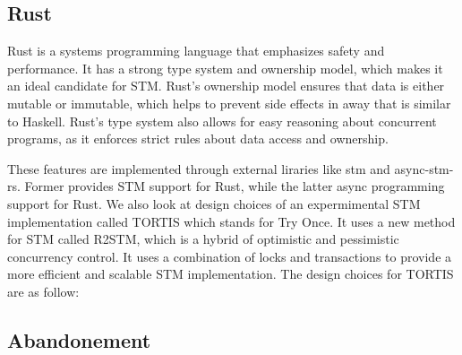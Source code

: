\subsection{Rust}
Rust is a systems programming language that emphasizes safety and performance. It has a strong type system and ownership model, which makes it an ideal candidate for STM. Rust's ownership model ensures that data is either mutable or immutable, which helps to prevent side effects in away that is similar to Haskell. Rust's type system also allows for easy reasoning about concurrent programs, as it enforces strict rules about data access and ownership.

These features are implemented through external liraries like stm and async-stm-rs. Former provides STM support for Rust, while the latter async programming support for Rust.
We also look at design choices of an expermimental STM implementation called TORTIS which stands for Try Once.
It uses a new method for STM called R2STM, which is a hybrid of optimistic and pessimistic concurrency control. It uses a combination of locks and transactions to provide a more efficient and scalable STM implementation. The design choices for TORTIS are as follow:\\


\subsection{Abandonement}

